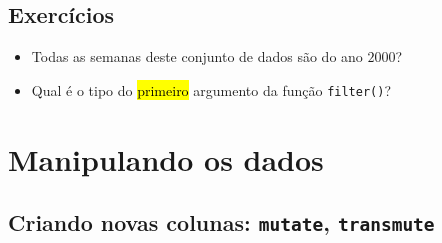 \documentclass[
  letterpaper,
  DIV=11,
  numbers=noendperiod]{scrreprt}
\begin{document}
\subsection{Exercícios}\label{exercuxedcios}

\begin{itemize}
\item
  Todas as semanas deste conjunto de dados são do ano $2000$?
\item
  Qual é o tipo do {\hl{primeiro}} argumento da função
  \texttt{filter()}?
\end{itemize}

\section{Manipulando os dados}\label{manipulando-os-dados}

\subsection{\texorpdfstring{Criando novas colunas: \texttt{mutate},
\texttt{transmute}}{Criando novas colunas: mutate, transmute}}\label{criando-novas-colunas-mutate-transmute}
\end{document}
